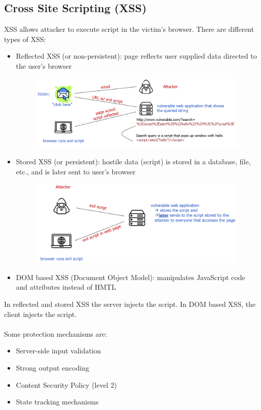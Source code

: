 \documentclass[10pt,a4paper]{report}
\begin{document}
\subsection{Cross Site Scripting (XSS)}
XSS allows attacker to execute script in the victim’s browser. There are different types of XSS:
\begin{itemize}
\item Reflected XSS (or non-persistent): page reflects user supplied data directed to the user’s browser
\begin{figure}[H]
\centering
\includegraphics[scale=0.4]{7.png}
\end{figure}
\item Stored XSS (or persistent): hostile data (script) is stored in a database, file, etc., and is later sent to user’s browser
\begin{figure}[H]
\centering
\includegraphics[scale=0.4]{8.png}
\end{figure}
\item DOM based XSS (Document Object Model): manipulates JavaScript code and attributes instead of HMTL
\end{itemize}
In reflected and stored XSS the server injects the script. In DOM based XSS, the client injects the script.\\
\\
Some protection mechanisms are:
\begin{itemize}
\item Server-side input validation
\item Strong output encoding
\item Content Security Policy (level 2)
\item State tracking mechanisms
\end{itemize}
\end{document}
